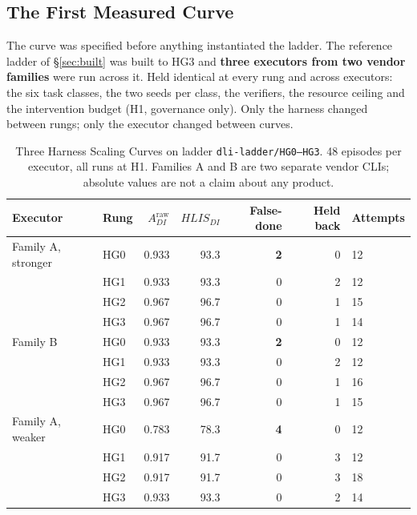 \documentclass[11pt]{article}
\theoremstyle{definition}
\begin{document}
\subsection{The First Measured Curve}\label{sec:measured}

The curve was specified before anything instantiated the ladder. The reference ladder of \S\ref{sec:built} was built to HG3 and \textbf{three executors from two vendor families} were run across it. Held identical at every rung and across executors: the six task classes, the two seeds per class, the verifiers, the resource ceiling and the intervention budget (H1, governance only). Only the harness changed between rungs; only the executor changed between curves.

\begin{table}[h]
\centering\small
\begin{tabularx}{\textwidth}{@{}p{}lrrrrY@{}}
\toprule
Executor & Rung & $A_{DI}^{\mathrm{raw}}$ & $HLIS_{DI}$ & False-done & Held back & Attempts \\
\midrule
Family A, stronger & HG0 & 0.933 & 93.3 & \textbf{2} & 0 & 12 \\
                   & HG1 & 0.933 & 93.3 & 0 & 2 & 12 \\
                   & HG2 & 0.967 & 96.7 & 0 & 1 & 15 \\
                   & HG3 & 0.967 & 96.7 & 0 & 1 & 14 \\
\midrule
Family B & HG0 & 0.933 & 93.3 & \textbf{2} & 0 & 12 \\
         & HG1 & 0.933 & 93.3 & 0 & 2 & 12 \\
         & HG2 & 0.967 & 96.7 & 0 & 1 & 16 \\
         & HG3 & 0.967 & 96.7 & 0 & 1 & 15 \\
\midrule
Family A, weaker & HG0 & 0.783 & 78.3 & \textbf{4} & 0 & 12 \\
                 & HG1 & 0.917 & 91.7 & 0 & 3 & 12 \\
                 & HG2 & 0.917 & 91.7 & 0 & 3 & 18 \\
                 & HG3 & 0.933 & 93.3 & 0 & 2 & 14 \\
\bottomrule
\end{tabularx}
\caption{Three Harness Scaling Curves on ladder \texttt{dli-ladder/HG0--HG3}. 48 episodes per executor, all runs at H1. Families A and B are two separate vendor CLIs; absolute values are not a claim about any product.}
\end{table}
\end{document}
